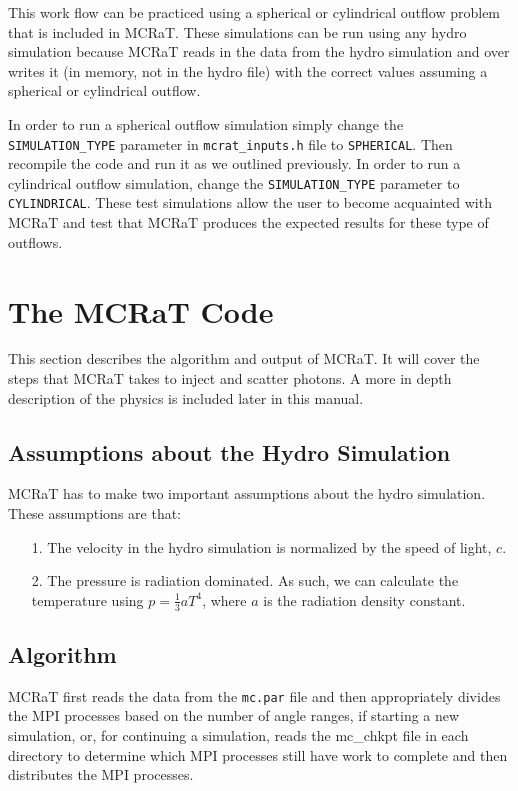 \documentclass[12pt,a4paper]{article}
\begin{document}
 This work flow can be practiced using a spherical or cylindrical outflow problem that is included in MCRaT. These simulations can be run using any hydro simulation because MCRaT reads in the data from the hydro simulation and over writes it (in memory, not in the hydro file) with the correct values assuming a spherical or cylindrical outflow.
 
 In order to run a spherical outflow simulation simply change the \texttt{SIMULATION\_TYPE} parameter in \texttt{mcrat\_inputs.h} file to \texttt{SPHERICAL}. Then recompile the code and run it as we outlined previously. In order to run a cylindrical outflow simulation, change the \texttt{SIMULATION\_TYPE} parameter to \texttt{CYLINDRICAL}. These test simulations allow the user to become acquainted with MCRaT and test that MCRaT produces the expected results for these type of outflows.
 

\section{The MCRaT Code}
This section describes the algorithm and output of MCRaT. It will cover the steps that MCRaT takes to inject and scatter photons. A more in depth description of the physics is included later in this manual.

\subsection{Assumptions about the Hydro Simulation}
MCRaT has to make two important assumptions about the hydro simulation. These assumptions are that:
\begin{itemize}
\item[1.] The velocity in the hydro simulation is normalized by the speed of light, $c$. 
\item[2.] The pressure is radiation dominated. As such, we can calculate the temperature using $p=\frac{1}{3}aT^4$, where $a$ is the radiation density constant.
\end{itemize}

\subsection{Algorithm}\label{algorithm}

MCRaT first reads the data from the \texttt{mc.par} file and then appropriately divides the MPI processes based on the number of angle ranges, if starting a new simulation, or, for continuing a simulation, reads the mc\_chkpt file in each directory to determine which MPI processes still have work to complete and then distributes the MPI processes. 
\end{document}
